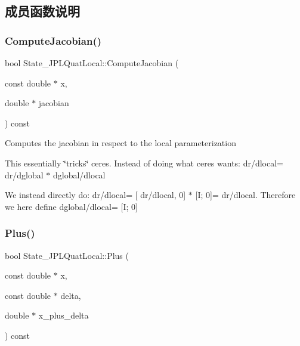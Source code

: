 \subsection{成员函数说明}
\mbox{\label{classov__init_1_1State__JPLQuatLocal_ab6732d5027ddfa89a76d00ef35ee2fc8}} 
\subsubsection{\texorpdfstring{Compute\+Jacobian()}{ComputeJacobian()}}
{\footnotesize\ttfamily bool State\+\_\+\+J\+P\+L\+Quat\+Local\+::\+Compute\+Jacobian (\begin{DoxyParamCaption}\item[{const double $\ast$}]{x,  }\item[{double $\ast$}]{jacobian }\end{DoxyParamCaption}) const\hspace{0.3cm}{\ttfamily [override]}}



Computes the jacobian in respect to the local parameterization 

This essentially \char`\"{}tricks\char`\"{} ceres. Instead of doing what ceres wants\+: dr/dlocal= dr/dglobal $\ast$ dglobal/dlocal

We instead directly do\+: dr/dlocal= \mbox{[} dr/dlocal, 0\mbox{]} $\ast$ \mbox{[}I; 0\mbox{]}= dr/dlocal. Therefore we here define dglobal/dlocal= \mbox{[}I; 0\mbox{]} \mbox{\label{classov__init_1_1State__JPLQuatLocal_ae0d6f02fa9043878a623bc46aee0c928}} 
\subsubsection{\texorpdfstring{Plus()}{Plus()}}
{\footnotesize\ttfamily bool State\+\_\+\+J\+P\+L\+Quat\+Local\+::\+Plus (\begin{DoxyParamCaption}\item[{const double $\ast$}]{x,  }\item[{const double $\ast$}]{delta,  }\item[{double $\ast$}]{x\+\_\+plus\+\_\+delta }\end{DoxyParamCaption}) const\hspace{0.3cm}{\ttfamily [override]}}



